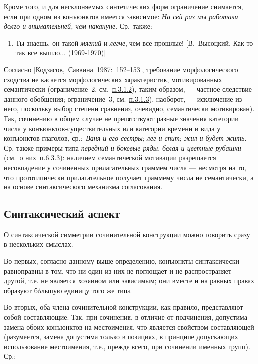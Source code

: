 Кроме того, и для несклоняемых синтетических форм ограничение снимается,
если при одном из конъюнктов имеется зависимое: \textit{На сей раз мы
  работали долго и внимательней, чем накануне}. Ср.~также:

\begin{enumerate}
  \def\labelenumi{(\arabic{enumi})}
  \setcounter{enumi}{8}
  \item
        Ты знаешь, он такой \textit{мягкий} и \textit{легче}, чем все прошлые!
        {[}В.~Высоцкий. Как-то так все вышло... (1969-1970){]}
\end{enumerate}

Согласно {[}Кодзасов,~Саввина~1987:~152--153{]}, требование
морфологического сходства не касается морфологических характеристик,
мотивированных семантически (ограничение~2, см.~\underline{п.3.1.2}),
таким образом, --- частное следствие данного обобщения; ограничение~3,
см.~\underline{п.3.1.3}), наоборот, --- исключение из него, поскольку
выбор степени сравнения, очевидно, семантически мотивирован). Так,
сочинению в общем случае не препятствуют разные значения категории числа
у конъюнктов-существительных или категории времени и вида у
конъюнктов-глаголов, ср.:~\textit{Ваня и его сестры}; \textit{лег и спит};
\textit{жил и будет жить}. Ср. также примеры типа \textit{передний и боковые
  ряды}, \textit{белая и цветные рубашки} (см.~о них~\underline{п.6.3.3}):
наличием семантической мотивации разрешается несовпадение у сочиненных
прилагательных граммем числа --- несмотря на то, что прототипически
прилагательное получает граммему числа не семантически, а на основе
синтаксического механизма согласования.

\subsection{Синтаксический
  аспект}\label{ux441ux438ux43dux442ux430ux43aux441ux438ux447ux435ux441ux43aux438ux439-ux430ux441ux43fux435ux43aux442}

О синтаксической симметрии сочинительной конструкции можно говорить
сразу в нескольких смыслах.

Во-первых, согласно данному выше определению, конъюнкты синтаксически
равноправны в том, что ни один из них не поглощает и не распространяет
другой, т.е. не является хозяином или зависимым; они вместе и на равных
правах образуют бóльшую единицу того же типа.

Во-вторых, оба члена сочинительной конструкции, как правило,
представляют собой составляющие. Так, при сочинении, в отличие от
подчинения, допустима замена обоих конъюнктов на местоимения, что
является свойством составляющей (разумеется, замена допустима только в
позициях, в принципе допускающих использование местоимения, т.е., прежде
всего, при сочинении именных групп). Ср.:

